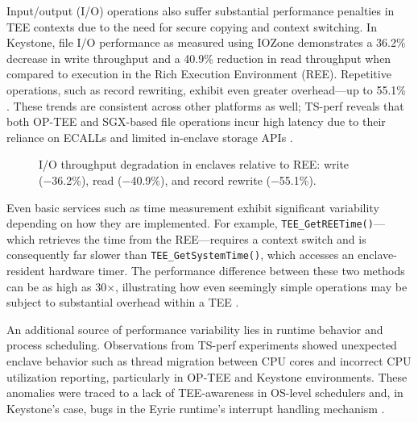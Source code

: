 Input/output (I/O) operations also suffer substantial performance penalties in TEE contexts due to the need for secure copying and context switching. In Keystone, file I/O performance as measured using IOZone demonstrates a 36.2\% decrease in write throughput and a 40.9\% reduction in read throughput when compared to execution in the Rich Execution Environment (REE). Repetitive operations, such as record rewriting, exhibit even greater overhead—up to 55.1\% \cite{dayeol2019keystone}. These trends are consistent across other platforms as well; TS-perf reveals that both OP-TEE and SGX-based file operations incur high latency due to their reliance on ECALLs and limited in-enclave storage APIs \cite{Suzaki2021}.

\begin{figure}[htbp]
\centering
{}
\caption{I/O throughput degradation in enclaves relative to REE: write (−36.2\%), read (−40.9\%), and record rewrite (−55.1\%).}
\label{fig:io-throughput}
\end{figure}


Even basic services such as time measurement exhibit significant variability depending on how they are implemented. For example, \texttt{TEE\_GetREETime()}—which retrieves the time from the REE—requires a context switch and is consequently far slower than \texttt{TEE\_GetSystemTime()}, which accesses an enclave-resident hardware timer. The performance difference between these two methods can be as high as 30×, illustrating how even seemingly simple operations may be subject to substantial overhead within a TEE \cite{Suzaki2021}.

An additional source of performance variability lies in runtime behavior and process scheduling. Observations from TS-perf experiments showed unexpected enclave behavior such as thread migration between CPU cores and incorrect CPU utilization reporting, particularly in OP-TEE and Keystone environments. These anomalies were traced to a lack of TEE-awareness in OS-level schedulers and, in Keystone's case, bugs in the Eyrie runtime's interrupt handling mechanism \cite{Suzaki2021}.

